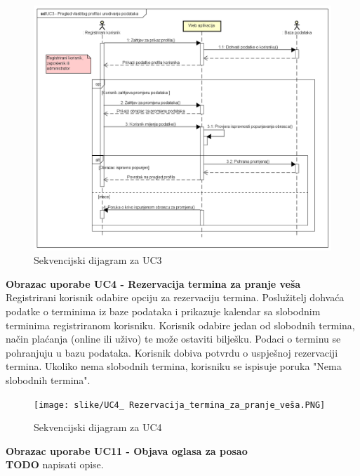 \begin{figure}[H]
	\includegraphics[scale=0.5]{slike/UC3_Pregled_vlastitog_profila.PNG} %
	\centering
	\caption{Sekvencijski dijagram za UC3}
	\label{fig:promjene}
\end{figure}

\textbf{Obrazac uporabe UC4 - Rezervacija termina za pranje veša}\\

{Registrirani korisnik odabire opciju za rezervaciju termina. Poslužitelj dohvaća podatke o terminima iz baze podataka i prikazuje kalendar sa slobodnim terminima registriranom korisniku. Korisnik odabire jedan od slobodnih termina, način plaćanja (online ili uživo) te može ostaviti bilješku. Podaci o terminu se pohranjuju u bazu podataka. Korisnik dobiva potvrdu o uspješnoj rezervaciji termina. Ukoliko nema slobodnih termina, korisniku se ispisuje poruka "Nema slobodnih termina".}


\begin{figure}[H]
	\texttt{[image: slike/UC4\_ Rezervacija\_termina\_za\_pranje\_veša.PNG]} %
	\centering
	\caption{Sekvencijski dijagram za UC4}
	\label{fig:promjene}
\end{figure}


\textbf{Obrazac uporabe UC11 - Objava oglasa za posao} \\

\textbf{TODO} napisati opise.


